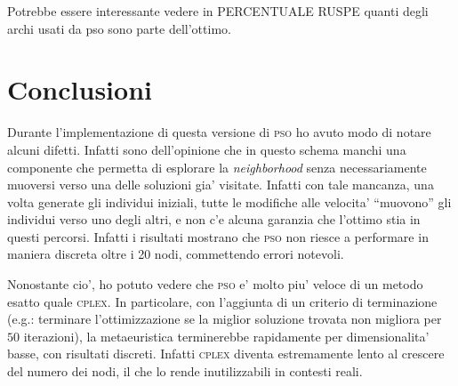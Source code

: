\documentclass[
12pt, %
a4paper, %
oneside, %
headinclude,footinclude, %
BCOR5mm, %
]{scrartcl}
\begin{document}
Potrebbe essere interessante vedere in PERCENTUALE RUSPE quanti degli archi usati da pso sono parte dell'ottimo. 
\section{Conclusioni}\label{sec:conclusioni}

Durante l'implementazione di questa versione di \textsc{pso} ho avuto modo di notare alcuni difetti. Infatti sono dell'opinione che in questo schema manchi una componente che permetta di esplorare la \textit{neighborhood} senza necessariamente muoversi verso una delle soluzioni gia' visitate. Infatti con tale mancanza, una volta generate gli individui iniziali, tutte le modifiche alle velocita' ``muovono'' gli individui verso uno degli altri, e non c'e alcuna garanzia che l'ottimo stia in questi percorsi. Infatti i risultati mostrano che \textsc{pso} non riesce a performare in maniera discreta oltre i 20 nodi, commettendo errori notevoli.
 
Nonostante cio', ho potuto vedere che \textsc{pso} e' molto piu' veloce di un metodo esatto quale \textsc{cplex}. In particolare, con l'aggiunta di un criterio di terminazione (e.g.: terminare l'ottimizzazione se la miglior soluzione trovata non migliora per $50$ iterazioni), la metaeuristica terminerebbe rapidamente per dimensionalita' basse, con risultati discreti. Infatti \textsc{cplex} diventa estremamente lento al crescere del numero dei nodi, il che lo rende inutilizzabili in contesti reali.

\renewcommand{\refname}{\spacedlowsmallcaps{References}} %




\end{document}
